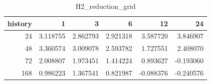 \begin{table}
\caption{H2_reduction_grid}
\label{tab:H2_reduction_grid}
\begin{tabular}{rrrrrr}
\toprule
history & 1 & 3 & 6 & 12 & 24 \\
\midrule
24 & 3.118755 & 2.862793 & 2.921318 & 3.587720 & 3.846907 \\
48 & 3.360574 & 3.009078 & 2.593782 & 1.727551 & 2.408070 \\
72 & 2.008807 & 1.973451 & 1.414224 & 0.893627 & -0.193060 \\
168 & 0.986223 & 1.367541 & 0.821987 & -0.088376 & -0.240576 \\
\bottomrule
\end{tabular}
\end{table}
